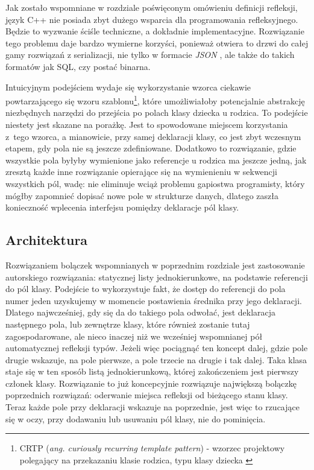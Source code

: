 \documentclass[12pt]{article}
\newcommand{\n}{\newline}
\newcommand{\nonpl}[1]{{\it #1}}
\newcommand{\ang}[1]{\nonpl{ang. #1}}
\newcommand{\JSON}{\nonpl{JSON} }
\begin{document}
{{			Jak zostało wspomniane w rozdziale poświęconym omówieniu definicji refleksji, język C++ nie posiada zbyt dużego wsparcia dla programowania
			refleksyjnego. Będzie to wyzwanie ściśle techniczne, a dokładnie implementacyjne. Rozwiązanie tego problemu daje bardzo wymierne korzyści,
			ponieważ otwiera to drzwi do całej gamy rozwiązań z serializacji, nie tylko w formacie \JSON, ale także do takich formatów jak SQL, czy
			postać binarna.\n

			Intuicyjnym podejściem wydaje się wykorzystanie wzorca ciekawie powtarzającego się wzoru szablonu\footnote{
				CRTP (\ang{curiously recurring template pattern}) - wzorzec projektowy polegający na przekazaniu klasie rodzica, typu klasy dziecka \cite{crtp_definition}
			}, które umożliwiałoby potencjalnie abstrakcję niezbędnych narzędzi do przejścia po polach klasy dziecka u rodzica. To podejście niestety jest skazane na
			porażkę. Jest to spowodowane miejscem korzystania z~tego wzorca, a mianowicie, przy samej deklaracji klasy, co jest zbyt wczesnym etapem, gdy pola nie są
			jeszcze zdefiniowane. Dodatkowo to rozwiązanie, gdzie wszystkie pola byłyby wymienione jako referencje u rodzica ma jeszcze jedną, jak zresztą każde
			inne rozwiązanie opierające się na wymienieniu w sekwencji wszystkich pól, wadę: nie eliminuje wciąż problemu gapiostwa programisty, który mógłby zapomnieć
			dopisać nowe pole w strukturze danych, dlatego zaszła konieczność wplecenia interfejsu pomiędzy deklaracje pól klasy.
		}

		{
			\subsection{Architektura}

			Rozwiązaniem bolączek wspomnianych w poprzednim rozdziale jest zastosowanie autorskiego rozwiązania: statycznej listy jednokierunkowe, na podstawie
			referencji do pól klasy. Podejście to wykorzystuje fakt, że dostęp do referencji do pola numer jeden uzyskujemy w momencie postawienia średnika przy jego deklaracji.
			Dlatego najwcześniej, gdy się da do takiego pola odwołać, jest deklaracja następnego pola, lub zewnętrze klasy, które również zostanie tutaj zagospodarowane,
			ale nieco inaczej niż we wcześniej wspomnianej pół automatycznej refleksji typów. Jeżeli więc pociągnąć ten koncept dalej, gdzie pole drugie wskazuje, na
			pole pierwsze, a pole trzecie na drugie i tak dalej. Taka klasa staje się w ten sposób listą jednokierunkową, której zakończeniem jest pierwszy członek klasy.
			Rozwiązanie to już koncepcyjnie rozwiązuje największą bolączkę poprzednich rozwiązań: oderwanie miejsca refleksji od bieżącego stanu klasy.
			Teraz każde pole przy deklaracji wskazuje na poprzednie, jest więc to rzucające się w oczy, przy dodawaniu lub usuwaniu pól klasy, nie do pominięcia.\n

}}
\end{document}
